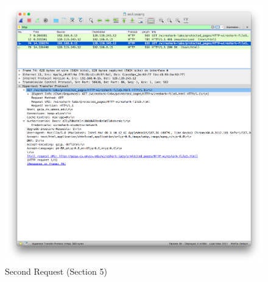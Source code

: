 \documentclass[11pt]{article}
\begin{document}
\begin{itemize}
	 \begin{figure}[H]
		\centering
		\caption{Second Request (Section 5)}
		\includegraphics[width=\textwidth]{05-request_2}
		\end{figure}

\end{itemize}
\end{document}

